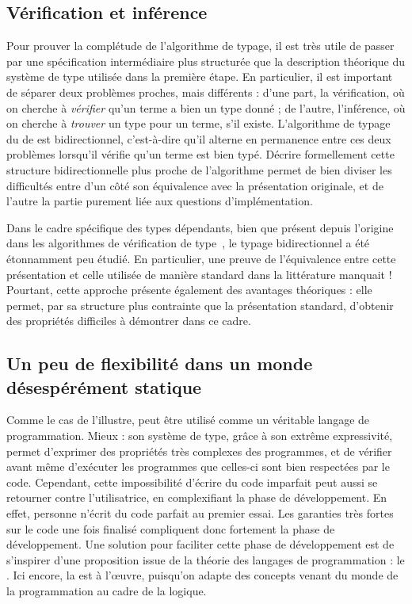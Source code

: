 \subsection{Vérification et inférence}

Pour prouver la complétude de l’algorithme de typage, il est très utile de
passer par une spécification intermédiaire plus structurée que la description
théorique du système de type utilisée dans la première étape.
En particulier, il est important de séparer deux problèmes proches, mais
différents :
d'une part, la vérification, où on cherche à \emph{vérifier}
qu’un terme a bien un type
donné ; de l’autre, l’inférence, où on cherche à \emph{trouver}
un type pour un terme, s'il existe.
L’algorithme de typage du  de  est bidirectionnel,
c'est-à-dire qu’il alterne en permanence entre ces deux problèmes
lorsqu’il vérifie qu’un terme est bien typé.
Décrire formellement cette structure bidirectionnelle plus proche de l’algorithme
permet de bien diviser les difficultés entre d’un côté
son équivalence avec la présentation
originale, et de l’autre la partie purement liée aux questions d’implémentation.

Dans le cadre spécifique des types dépendants, bien que présent depuis l’origine dans les algorithmes de vérification de type~,
le typage bidirectionnel a été étonnamment peu étudié. En particulier, une preuve
de l’équivalence entre cette présentation et celle utilisée de manière standard
dans la littérature manquait !
Pourtant, cette approche présente également
des avantages théoriques : elle permet,
par sa structure plus contrainte que la présentation standard,
d’obtenir des propriétés difficiles à démontrer dans ce cadre.

\subsection{Un peu de flexibilité dans un monde désespérément statique}
\label{sec:intro-graduel}

Comme le cas de  l’illustre,  peut être utilisé comme un véritable langage
de programmation. Mieux : son système de type, grâce à son extrême expressivité, 
permet d’exprimer des propriétés très complexes des programmes, et de vérifier
avant même d’exécuter les programmes que celles-ci sont bien respectées par le code.
Cependant, cette impossibilité d’écrire du code imparfait peut aussi se retourner contre l’utilisatrice, en complexifiant la phase de développement.
En effet, personne n’écrit du code parfait au premier essai. Les garanties très
fortes sur le code une fois finalisé compliquent donc 
fortement la phase de développement.
Une solution pour faciliter cette phase de développement
est de s’inspirer d’une proposition issue de la théorie des langages de
programmation : le . Ici encore, la 
est à l’œuvre, puisqu’on adapte des concepts venant du monde de la programmation
au cadre de la logique.

